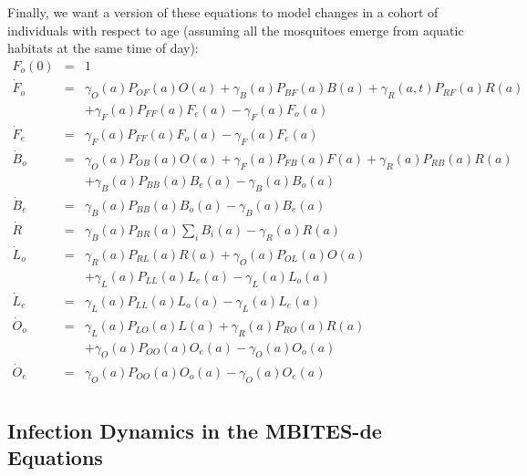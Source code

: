 \documentclass{article}
\begin{document}
Finally, we want a version of these equations to model changes in a cohort of individuals with respect to age (assuming all the mosquitoes emerge from aquatic habitats at the same time of day): 
%
\begin{equation}\begin{array}{rcl}
F_o(0) &=& 1 \\ 
%
{\dot F}_o&=& 
\gamma_O(a) P_{OF}(a) O(a) 
+ \gamma_B(a) P_{BF}(a) B(a) 
 + \gamma_R(a,t) P_{RF}(a) R(a)
\\ &&
+ \gamma_F(a) P_{FF}(a) F_e(a) 
- \gamma_F(a) F_o(a) \\ 
%
{\dot F}_e &=&  \gamma_F(a) P_{FF}(a) F_o (a) - \gamma_F(a) F_e(a) \\ 
%
%
{\dot B}_o &=&  \gamma_O(a) P_{OB}(a) O(a) + \gamma_F(a) P_{FB}(a) F(a) 
+ \gamma_R(a) P_{RB}(a) R(a) \\ && 
+ \gamma_B(a) P_{BB}(a) B_e(a)
- \gamma_B(a) B_o(a)\\
%
{\dot B}_e &=& \gamma_B(a) P_{BB}(a) B_o(a) -
\gamma_B(a) B_e(a) 
\\
%
{\dot R} &=&  \gamma_B(a) P_{BR}(a) \sum_i B_i(a) - \gamma_R(a) R(a)\\ 
%
{\dot L}_o&=& \gamma_R(a) P_{RL}(a) R(a) + 
\gamma_O(a) P_{OL}(a) O(a) \\&&
+ \gamma_L(a)  P_{LL}(a) L_e(a)
- \gamma_L(a) L_o(a)
\\ 
%
{\dot L}_e &=& \gamma_L(a) P_{LL}(a) L_o (a) - \gamma_L(a) L_e(a)
\\ 
%
{\dot O}_o &=& \gamma_L(a) P_{LO}(a) L(a) 
+ \gamma_R(a) P_{RO}(a) R(a)  
\\&& 
+ \gamma_O(a) P_{OO}(a) O_e(a)
- \gamma_O(a) O_o(a)
\\ 
%
{\dot O}_e &=& \gamma_O(a) P_{OO}(a) O_o (a) - \gamma_O(a) O_e(a)
\\ 
%
\end{array}\end{equation}

\subsection{Infection Dynamics in the MBITES-de Equations}
\end{document}
